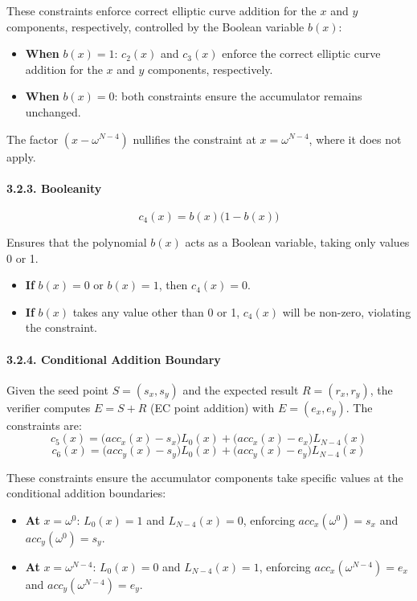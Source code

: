 \documentclass[
]{article}
\providecommand{\tightlist}{%
  \setlength{\itemsep}{0pt}\setlength{\parskip}{0pt}}
\begin{document}
These constraints enforce correct elliptic curve addition for the \(x\)
and \(y\) components, respectively, controlled by the Boolean variable
\(b(x)\):

\begin{itemize}
\tightlist
\item
  \textbf{When} \(b(x) = 1\): \(c_2(x)\) and \(c_3(x)\) enforce the
  correct elliptic curve addition for the \(x\) and \(y\) components,
  respectively.
\item
  \textbf{When} \(b(x) = 0\): both constraints ensure the accumulator
  remains unchanged.
\end{itemize}

The factor \((x - \omega^{N-4})\) nullifies the constraint at
\(x = \omega^{N-4}\), where it does not apply.

\paragraph{3.2.3. Booleanity}\label{booleanity}

\[c_4(x) = b(x)\bigl(1 - b(x)\bigr)\]

Ensures that the polynomial \(b(x)\) acts as a Boolean variable, taking
only values 0 or 1.

\begin{itemize}
\tightlist
\item
  \textbf{If} \(b(x) = 0\) or \(b(x) = 1\), then \(c_4(x) = 0\).
\item
  \textbf{If} \(b(x)\) takes any value other than 0 or 1, \(c_4(x)\)
  will be non-zero, violating the constraint.
\end{itemize}

\paragraph{3.2.4. Conditional Addition
Boundary}\label{conditional-addition-boundary}

Given the seed point \(S = (s_x, s_y)\) and the expected result
\(R = (r_x, r_y)\), the verifier computes \(E = S + R\) (EC point
addition) with \(E = (e_x, e_y)\). The constraints are:
\[c_5(x) = \bigl(acc_x(x) - s_x\bigr)L_0(x) + \bigl(acc_x(x) - e_x\bigr)L_{N-4}(x)\]
\[c_6(x) = \bigl(acc_y(x) - s_y\bigr)L_0(x) + \bigl(acc_y(x) - e_y\bigr)L_{N-4}(x)\]

These constraints ensure the accumulator components take specific values
at the conditional addition boundaries:

\begin{itemize}
\tightlist
\item
  \textbf{At} \(x = \omega^0\): \(L_0(x) = 1\) and \(L_{N-4}(x) = 0\),
  enforcing \(acc_x(\omega^0) = s_x\) and \(acc_y(\omega^0) = s_y\).
\item
  \textbf{At} \(x = \omega^{N-4}\): \(L_0(x) = 0\) and
  \(L_{N-4}(x) = 1\), enforcing \(acc_x(\omega^{N-4}) = e_x\) and
  \(acc_y(\omega^{N-4}) = e_y\).
\end{itemize}
\end{document}
